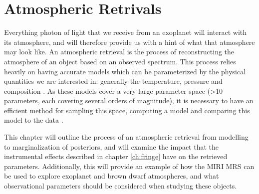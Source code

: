 \chapter{Atmospheric Retrivals}
Everything photon of light that we receive from an exoplanet will interact with its atmosphere, and will therefore provide us with a hint of what that atmosphere may look like.
An atmospheric retrieval is the process of reconstructing the atmosphere of an object based on an observed spectrum.
This process relies heavily on having accurate models which can be parameterized by the physical quantities we are interested in: generally the temperature, pressure and composition \autocite{Madhusudhan2018}.
As these models cover a very large parameter space (>10 parameters, each covering several orders of magnitude), it is necessary to have an efficient method for sampling this space, computing a model and comparing this model to the data 
\autocite{Benneke2012}.

This chapter will outline the process of an atmospheric retrieval from modelling to marginalization of posteriors, and will examine the impact that the instrumental effects described in chapter \ref{ch:fringe} have on the retrieved parameters. 
Additionally, this will provide an example of how the MIRI MRS can be used to explore exoplanet and brown dwarf atmospheres, and what observational parameters should be considered when studying these objects.

\cite{Schlawin2018} %
\cite{Fisher2019} %
\cite{Oreshenko2019}%
\cite{Barman2015} %
\cite{Benneke2013} %
\cite{Benneke2012} %
\cite{Blanco-Cuaresma2018} %
\cite{Konopacky2013} %

\cite{Morley2018} %
\cite{Lupu2018} %
\cite{Gandhi2018} %
\cite{Baudino2017} %
\cite{Line2013} %
\cite{Madhusudhan2018b} %
\cite{Irwin2008} %
\cite{Robinson2016} %
\cite{Waldmann2015} %
\cite{Waldmann2015a} %
\cite{Line2015,Line2017,Zalesky2019} %

